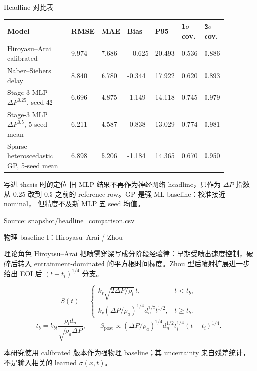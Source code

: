 \documentclass[aspectratio=169,11pt]{beamer}
\newcommand{\good}[1]{\textcolor{goodGreen}{#1}}
\newcommand{\sourcenote}[1]{\vfill{\tiny\textcolor{gray!70!black}{Source: \url{#1}}}}
\begin{document}
\begin{frame}{Headline 对比表}
\scriptsize
{\setlength{\tabcolsep}{3pt}
\begin{tabular}{L{0.34\linewidth}R{0.09\linewidth}R{0.09\linewidth}R{0.09\linewidth}R{0.09\linewidth}R{0.09\linewidth}R{0.09\linewidth}}
\toprule
Model & RMSE & MAE & Bias & P95 & 1\(\sigma\) cov. & 2\(\sigma\) cov. \\
\midrule
Hiroyasu--Arai calibrated & 9.974 & 7.686 & +0.625 & 20.493 & 0.536 & 0.886 \\
Naber--Siebers delay & 8.840 & 6.780 & -0.344 & 17.922 & 0.620 & 0.893 \\
Stage-3 MLP \(\Delta P^{0.25}\), seed 42 & 6.696 & 4.875 & -1.149 & 14.118 & 0.745 & 0.979 \\
\good{Stage-3 MLP \(\Delta P^{0.5}\), 5-seed mean} & \good{6.211} & \good{4.587} & \good{-0.838} & \good{13.029} & \good{0.774} & \good{0.981} \\
Sparse heteroscedastic GP, 5-seed mean & 6.898 & 5.206 & -1.184 & 14.365 & 0.670 & 0.950 \\
\bottomrule
\end{tabular}
}

\vspace{0.7em}
\small
\begin{block}{写进 thesis 时的定位}
旧 MLP 结果不再作为神经网络 headline，只作为 \(\Delta P\) 指数从
0.25 改到 0.5 之前的 reference row。GP 是强 ML baseline：校准接近 nominal，
但精度不及新 MLP 五 seed 均值。
\end{block}

\sourcenote{snapshot/headline_comparison.csv}
\end{frame}

\begin{frame}{物理 baseline I：Hiroyasu--Arai / Zhou}
\small
\begin{block}{理论角色}
\footnotesize
Hiroyasu--Arai 把喷雾穿深写成分阶段经验律：早期受喷出速度控制，破碎后转入
entrainment-dominated 的平方根时间标度。Zhou 型后喷射扩展进一步给出 EOI 后
\((t-t_i)^{1/4}\) 分支。
\end{block}

\vspace{-0.2em}
\[
S(t)=
\begin{cases}
k_v\sqrt{2\Delta P/\rho_l}\,t, & t<t_b,\\[0.25em]
k_p(\Delta P/\rho_a)^{1/4}d_n^{1/2}t^{1/2}, & t\ge t_b.
\end{cases}
\]
\[
t_b=k_{bt}\frac{\rho_l d_n}{\sqrt{\rho_a\Delta P}},
\qquad
S_{\mathrm{post}}\propto
(\Delta P/\rho_a)^{1/4}d_n^{1/2}t_i^{1/4}(t-t_i)^{1/4}.
\]

\footnotesize
本研究使用 calibrated 版本作为强物理 baseline；其 uncertainty 来自残差统计，
不是输入相关的 learned \(\sigma(x,t)\)。
\end{frame}
\end{document}
